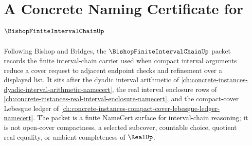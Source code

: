 \chapter{A Concrete Naming Certificate for $\BishopFiniteIntervalChainUp$}
\label{ch:concrete-instances-bishop-finite-interval-chain-namecert}

Following Bishop and Bridges, the $\BishopFiniteIntervalChainUp$ packet records the finite interval-chain carrier used when compact interval arguments reduce a cover request to adjacent endpoint checks and refinement over a displayed list. It sits after the dyadic interval arithmetic of \autoref{ch:concrete-instances-dyadic-interval-arithmetic-namecert}, the real interval enclosure rows of \autoref{ch:concrete-instances-real-interval-enclosure-namecert}, and the compact-cover Lebesgue ledger of \autoref{ch:concrete-instances-compact-cover-lebesgue-ledger-namecert}. The packet is a finite NameCert surface for interval-chain reasoning; it is not open-cover compactness, a selected subcover, countable choice, quotient real equality, or ambient completeness of $\RealUp$.

